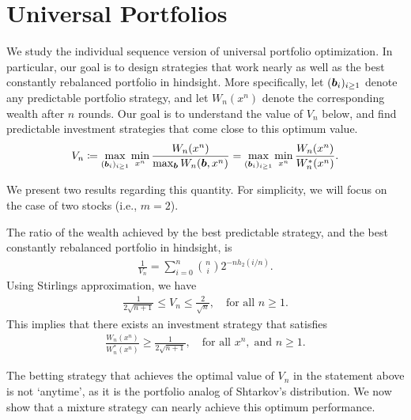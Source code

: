         
\section{Universal Portfolios}
\label{sec:universal-portfolios}
    We study the individual sequence version of universal portfolio optimization. In particular, our goal is to design strategies that work nearly as well as the best constantly rebalanced portfolio in hindsight. More specifically, let $(\boldsymbol{b}_i)_{i \geq 1}$ denote any predictable portfolio strategy, and let $W_n(x^n)$ denote the corresponding wealth after $n$ rounds. Our goal is to understand the value of $V_n$ below, and find predictable investment strategies that come close to this optimum value. 
    \begin{align}
        V_n \coloneqq \max_{(\boldsymbol{b}_i)_{i \geq 1}} \min_{x^n}  \frac{W_n(x^n)}{\max_{\boldsymbol{b}}W_n(\boldsymbol{b}, x^n)} = \max_{(\boldsymbol{b}_i)_{i \geq 1}} \min_{x^n}  \frac{W_n(x^n)}{W_n^*(x^n)}. 
    \end{align}

    We present two results regarding this quantity. For simplicity, we will focus on the case of two stocks (i.e., $m=2$). 

    \begin{proposition}
        \label{prop:universal-portfolio-1} The ratio of the wealth achieved by the best predictable strategy, and the best constantly rebalanced portfolio in hindsight, is 
        \begin{align}
            \frac{1}{V_n} = \sum_{i=0}^n {n \choose i} 2^{-n h_2(i/n)}. 
        \end{align}
        Using Stirlings approximation, we have 
        \begin{align}
            \frac{1}{2 \sqrt{n+1}} \leq V_n \leq \frac{2}{\sqrt{n} }, \quad \text{for all } n \geq 1. 
        \end{align}
        This implies that there exists an investment strategy that satisfies 
        \begin{align}
            \frac{W_n(x^n)}{W_n^*(x^n)} \geq \frac{1}{2 \sqrt{n+1}}, \quad \text{for all } x^n, \; \text{and } n \geq 1. 
        \end{align}
    \end{proposition}

    The betting strategy that achieves the optimal value of $V_n$ in the statement above is not `anytime', as it is the portfolio analog of Shtarkov's distribution. We now show that a mixture strategy can nearly achieve this optimum performance. 

